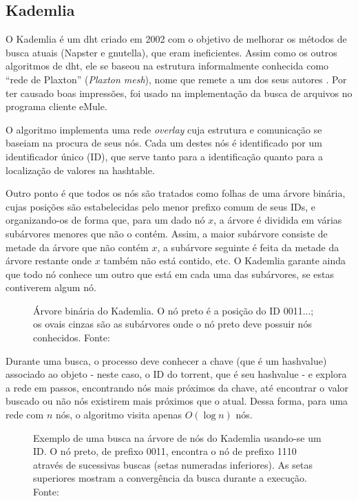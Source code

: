 
\subsection*{Kademlia}

O Kademlia é um \gls*{dht} criado em 2002 \cite{artigo:kademlia} com o objetivo de
melhorar os métodos de busca atuais (Napster e \gls*{gnutella}), que eram ineficientes.
Assim como os outros algoritmos de \gls*{dht}, ele se baseou na estrutura informalmente
conhecida como \enquote{rede de Plaxton} (\emph{Plaxton mesh}), nome que remete a um
dos seus autores \cite{artigo:dht}. Por ter causado boas impressões, foi usado na
implementação da busca de arquivos no programa cliente eMule.

O algoritmo implementa uma rede \emph{overlay} cuja estrutura e comunicação se baseiam
na procura de seus nós. Cada um destes nós é identificado por um identificador único
(ID), que serve tanto para a identificação quanto para a localização de valores na
\gls*{hashtable}.

Outro ponto é que todos os nós são tratados como folhas de uma árvore binária, cujas
posições são estabelecidas pelo menor prefixo comum de seus IDs, e organizando-os de
forma que, para um dado nó $x$, a árvore é dividida em várias subárvores menores que
não o contém. Assim, a maior subárvore consiste de metade da árvore que não contém $x$,
a subárvore seguinte é feita da metade da árvore restante onde $x$ também não está
contido, etc. O Kademlia garante ainda que todo nó conhece um outro que está em cada
uma das subárvores, se estas contiverem algum nó.

\begin{figure}[ht!]
    \centering
    \caption{Árvore binária do Kademlia. O nó preto é a posição do ID 0011...; os ovais
    cinzas são as subárvores onde o nó preto deve possuir nós conhecidos. Fonte:
    \cite{artigo:kademlia}}
    \label{fig:dht-arvore}
\end{figure}

Durante uma busca, o processo deve conhecer a chave (que é um
\gls*{hashvalue}) associado ao objeto - neste caso, o ID do \gls*{torrent}, que é seu
\gls*{hashvalue} - e explora a rede em passos, encontrando nós mais próximos da chave,
até encontrar o valor buscado ou não nós existirem mais próximos que o atual. Dessa
forma, para uma rede com $n$ nós, o algoritmo visita apenas $O(\log n)$ nós.

\begin{figure}[ht!]
    \centering
    \caption{Exemplo de uma busca na árvore de nós do Kademlia usando-se um ID. O nó
    preto, de prefixo 0011, encontra o nó de prefixo 1110 através de sucessivas buscas
    (setas numeradas inferiores). As setas superiores mostram a convergência da
    busca durante a execução. Fonte: \cite{artigo:kademlia}}
    \label{fig:dht-arvore-busca}
\end{figure}